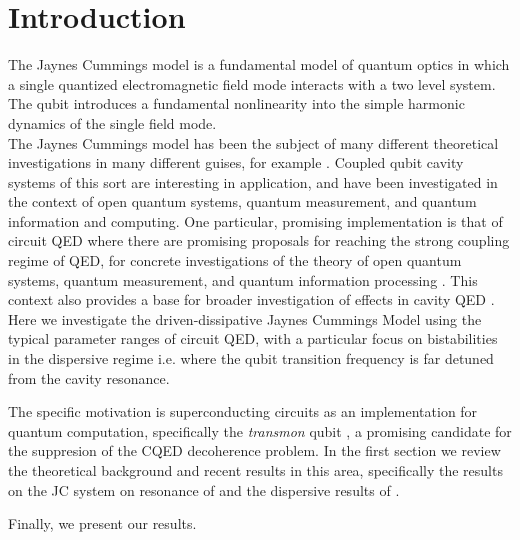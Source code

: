 \section{Introduction}
The Jaynes Cummings model is a fundamental model of quantum optics in which a single quantized electromagnetic field mode interacts with a two level system. 
The qubit introduces a fundamental nonlinearity into the simple harmonic dynamics of the single field mode. \\

The Jaynes Cummings model has been the subject of many different theoretical investigations in many different guises, for example
\cite{Abdalla2011}
\cite{Benivegna1994}.
Coupled qubit cavity systems of this sort are interesting in application, and have been investigated in the context of open quantum systems, quantum measurement, and quantum information and computing.
One particular, promising implementation is that of circuit QED 
\cite{Blais2004a} 
\cite{Makhlin2000} 
\cite{Koch2007} 
where there are promising proposals for reaching the strong coupling regime of QED, for concrete investigations of the theory of open quantum systems, quantum measurement, and quantum information processing
\cite{You2003} 
\cite{Hood2000} 
\cite{Irish2003} .
This context also provides a base for broader investigation of effects in cavity QED 
\cite{Al-Saidi2002} 
\cite{Plastina2003} 
\cite{Marquardt2001} .\\

Here we investigate the driven-dissipative Jaynes Cummings Model using the typical parameter ranges of circuit QED, with a particular focus on bistabilities in the dispersive regime i.e. where the qubit transition frequency is far detuned from the cavity resonance.

The specific motivation is superconducting circuits as an implementation for quantum computation, specifically the \emph{transmon} qubit \cite{Koch2007}, a promising candidate for the suppresion of the CQED decoherence problem.
In the first section we review the theoretical background and recent results in this area, specifically the results on the JC system on resonance of \cite{Carmichael2015} and the dispersive results of \cite{Bishop2010}.

Finally, we present our results.
